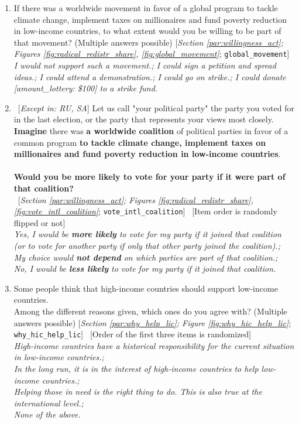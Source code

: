 \documentclass[12pt,english]{article}
\begin{document}
\begin{bibunit}
\begin{enumerate}[resume]
\item  \label{q:global_movement} If there was a worldwide movement in favor of a global program to tackle climate change, implement taxes on millionaires and fund poverty reduction in low-income countries, to what extent would you be willing to be part of that movement? (Multiple answers possible) [\textit{Section \ref{par:willingness_act}; Figures \ref{fig:radical_redistr_share}, \ref{fig:global_movement}}; 
\verb|global_movement|]
  \\ \textit{I would \textit{not} support such a movement.; I could sign a petition and spread ideas.; I could attend a demonstration.; I could go on strike.; I could donate [amount\_lottery: \$100] to a strike fund.}

\item ~[\textit{Except in: RU, SA}] \label{q:vote_intl_coalition} Let us call "your political party" the party you voted for in the last election, or the party that represents your views most closely.~\\\textbf{Imagine }there was \textbf{a worldwide coalition} of political parties in favor of a common program \textbf{to tackle climate change, implement taxes on millionaires and fund poverty reduction in low-income countries}.~\\\\\textbf{Would you be more likely 
to vote for your party if it were part of that coalition?}\\ 
~[\textit{Section \ref{par:willingness_act}; Figures \ref{fig:radical_redistr_share}, \ref{fig:vote_intl_coalition}}; 
\verb|vote_intl_coalition|]
~[Item order is randomly flipped or not]
  \\ \textit{Yes, I would be \textbf{more likely} to vote for my party if it joined that coalition (or to vote for another party if only that other party joined the coalition).; \\My choice would \textbf{not depend} on which parties are part of that coalition.; \\No, I would be \textbf{less likely} to vote for my party if it joined that coalition.}

\item  \label{q:why_hic_help_lic} Some people think that high-income countries should support low-income countries.~\\Among the different reasons given, which ones do you agree with? (Multiple answers possible) [\textit{Section \ref{par:why_help_lic}; Figure \ref{fig:why_hic_help_lic}}; 
\verb|why_hic_help_lic|]
~[Order of the first three items is randomized]
  \\ \textit{High-income countries have a historical responsibility for the current situation in low-income countries.; \\In the long run, it is in the interest of high-income countries to help low-income countries.; \\Helping those in need is the right thing to do. This is also true at the international level.; \\None of the above.}


\end{enumerate}
\end{bibunit}
\end{document}
